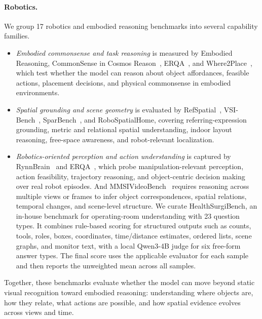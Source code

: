 \paragraph{Robotics.} 
We group 17 robotics and embodied reasoning benchmarks into several capability families.
\begin{itemize}
  \item \textit{Embodied commonsense and task reasoning} is measured by Embodied Reasoning, CommonSense in Cosmos Reason~\citep{azzolini2025cosmos}, ERQA~\citep{gemini2025robotics}, and Where2Place~\citep{yuan2024robopoint}, which test whether the model can reason about
  object affordances, feasible actions,  placement decisions, and physical commonsense in embodied environments.
  \item \textit{Spatial grounding and scene geometry} is evaluated by RefSpatial~\citep{zhou2025roborefer}, VSI-Bench~\citep{yang2024vsibench}, SparBench~\citep{zhang2025spar}, and RoboSpatialHome\citep{song2025robospatial}, covering referring-expression grounding, metric and relational
  spatial understanding, indoor layout reasoning, free-space awareness, and robot-relevant localization.
  \item \textit{Robotics-oriented perception and action understanding} is captured by RynnBrain~\citep{dang2026rynnbrain} and ERQA~\citep{gemini2025robotics}, which probe manipulation-relevant perception, action feasibility, trajectory reasoning, and object-centric decision making over real robot episodes.
  And MMSIVideoBench~\citep{lin2025mmsivideobench} requires reasoning across multiple views or frames to infer object
  correspondences, spatial relations, temporal changes, and scene-level structure. We curate HealthSurgiBench, an in-house benchmark for operating-room understanding with 23 question types. It combines rule-based scoring for structured outputs such as counts, tools, roles,
  boxes, coordinates, time/distance estimates, ordered lists, scene graphs, and monitor text, with a local Qwen3-4B judge for six free-form answer types. The final score uses the applicable evaluator for each sample and then reports the unweighted mean across all samples.
\end{itemize}
Together, these benchmarks evaluate whether the model can move beyond static visual recognition toward embodied reasoning: understanding where objects are, how they relate, what actions are possible, and how spatial evidence evolves across views and time.

